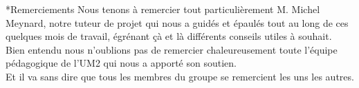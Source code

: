 \documentclass[a4paper, 12pt]{report}
\begin{document}
	\begin{chapter}*{Remerciements}
	Nous tenons à remercier tout particulièrement M. Michel Meynard, notre tuteur de projet qui nous a guidés et épaulés tout au long de
	ces quelques mois de travail, égrénant çà et là différents conseils utiles à souhait. \\

	Bien entendu nous n'oublions pas de remercier chaleureusement toute l'équipe pédagogique de l'UM2 qui nous a apporté son soutien.\\

	Et il va sans dire que tous les membres du groupe se remercient les uns les autres.
	\end{chapter} 
	\tableofcontents
	\listoffigures
	\listoftables
\end{document}
